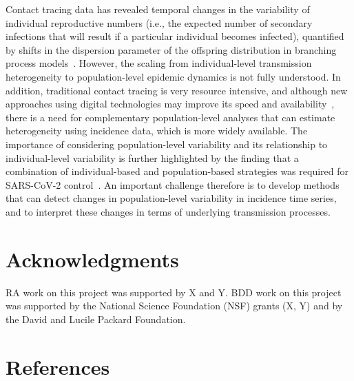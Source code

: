 \documentclass[11pt,letterpaper]{article}
\begin{document}
Contact tracing data has revealed temporal changes in the variability of individual reproductive numbers (i.e., the expected number of secondary infections that will result if a particular individual becomes infected), quantified by shifts in the dispersion parameter of the offspring distribution in branching process models~\cite{guo2023statistical,ko2023time}.
However, the scaling from individual-level transmission heterogeneity to population-level epidemic dynamics is not fully understood.
In addition, traditional contact tracing is very resource intensive, and although new approaches using digital technologies may improve its speed and availability~\cite{kretzschmar2020impact}, there is a need for complementary population-level analyses that can estimate heterogeneity using incidence data, which is more widely available.
The importance of considering population-level variability and its relationship to individual-level variability is further highlighted by the finding that a combination of individual-based and population-based strategies was required for SARS-CoV-2 control~\cite{sun2021transmission}. 
An important challenge therefore is to develop methods that can detect changes in population-level variability in incidence time series, and to interpret these changes in terms of underlying transmission processes.

\section*{Acknowledgments}
RA work on this project was supported by X and Y. BDD work on this project was supported by the National Science Foundation (NSF) grants (X, Y) and by the David and Lucile Packard Foundation.

\section*{References}

\end{document}
